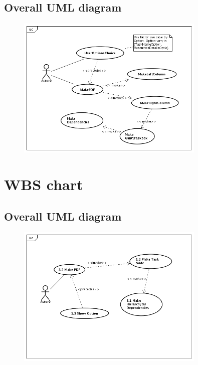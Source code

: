 \documentclass[a4paper, 12pt]{report}
\begin{document}
\section*{Overall UML diagram}
\begin{figure}[h!] \centering
\includegraphics[width=0.8\textwidth]{Gantt/img/MakePDF.png} 
\end{figure}






\chapter{WBS chart}
\section*{Overall UML diagram}
\begin{figure}[h!] \centering
\includegraphics[width=0.8\textwidth]{WBS/WBSChart.png} 
\end{figure}


\end{document}
